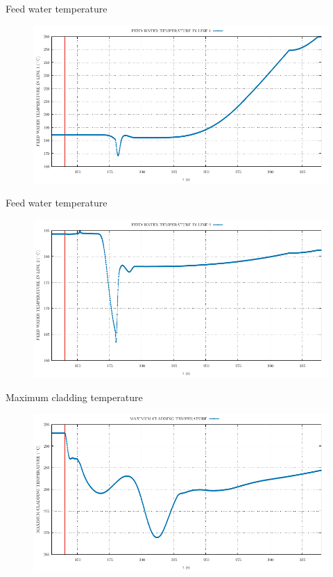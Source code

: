 \begin{frame}{Feed water temperature}
	\begin{figure}
		\centering
		\includegraphics[width=\textwidth]{./graphs/FEED WATER TEMPERATURE IN LINE 1_comp.pdf}
		
	\end{figure}
	
\end{frame}
\begin{frame}{Feed water temperature}
	\begin{figure}
		\centering
		\includegraphics[width=\textwidth]{./graphs/FEED WATER TEMPERATURE IN LINE 2_comp.pdf}
		
	\end{figure}
	
\end{frame}
\begin{frame}{Maximum cladding temperature}
	\begin{figure}
		\centering
		\includegraphics[width=\textwidth]{./graphs/MAXIMUM CLADDING TEMPERATURE_comp.pdf}
		
	\end{figure}
	
\end{frame}

